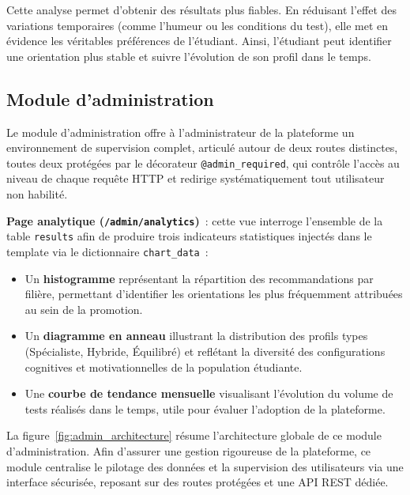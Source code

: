 \documentclass[a4paper,12pt]{article}
\begin{document}
Cette analyse permet d'obtenir des résultats plus fiables. En réduisant l'effet des variations temporaires (comme l'humeur ou les conditions du test), elle met en évidence les véritables préférences de l'étudiant. Ainsi, l'étudiant peut identifier une orientation plus stable et suivre l'évolution de son profil dans le temps.
\newpage

\subsection{Module d'administration}

Le module d'administration offre à l'administrateur de la plateforme un environnement
de supervision complet, articulé autour de deux routes distinctes, toutes deux protégées
par le décorateur \texttt{@admin\_required}, qui contrôle l'accès au niveau de chaque
requête HTTP et redirige systématiquement tout utilisateur non habilité.

\textbf{Page analytique (\texttt{/admin/analytics})}~: cette vue interroge l'ensemble
de la table \texttt{results} afin de produire trois indicateurs statistiques injectés
dans le template via le dictionnaire \texttt{chart\_data}~:
\begin{itemize}
    \item Un \textbf{histogramme} représentant la répartition des recommandations
          par filière, permettant d'identifier les orientations les plus fréquemment
          attribuées au sein de la promotion.
    \item Un \textbf{diagramme en anneau} illustrant la distribution des profils
          types (Spécialiste, Hybride, Équilibré) et reflétant la diversité des
          configurations cognitives et motivationnelles de la population étudiante.
    \item Une \textbf{courbe de tendance mensuelle} visualisant l'évolution du volume
          de tests réalisés dans le temps, utile pour évaluer l'adoption de la plateforme.
\end{itemize}

La figure~\ref{fig:admin_architecture} résume l'architecture globale de ce module d'administration. Afin d'assurer une gestion rigoureuse de la plateforme, ce module centralise le pilotage des données et la supervision des utilisateurs via une interface sécurisée, reposant sur des routes protégées et une API REST dédiée.
\end{document}
